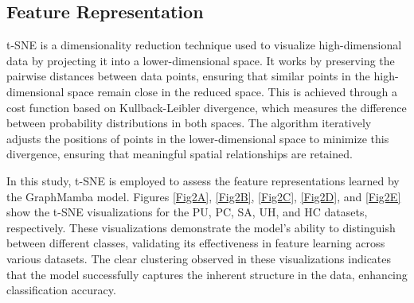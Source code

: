 \documentclass[journal]{IEEEtran}
\begin{document}
\subsection{Feature Representation}

t-SNE is a dimensionality reduction technique used to visualize high-dimensional data by projecting it into a lower-dimensional space. It works by preserving the pairwise distances between data points, ensuring that similar points in the high-dimensional space remain close in the reduced space. This is achieved through a cost function based on Kullback-Leibler divergence, which measures the difference between probability distributions in both spaces. The algorithm iteratively adjusts the positions of points in the lower-dimensional space to minimize this divergence, ensuring that meaningful spatial relationships are retained.

In this study, t-SNE is employed to assess the feature representations learned by the GraphMamba model. Figures \ref{Fig2A}, \ref{Fig2B}, \ref{Fig2C}, \ref{Fig2D}, and \ref{Fig2E} show the t-SNE visualizations for the PU, PC, SA, UH, and HC datasets, respectively. These visualizations demonstrate the model's ability to distinguish between different classes, validating its effectiveness in feature learning across various datasets. The clear clustering observed in these visualizations indicates that the model successfully captures the inherent structure in the data, enhancing classification accuracy.
\end{document}
